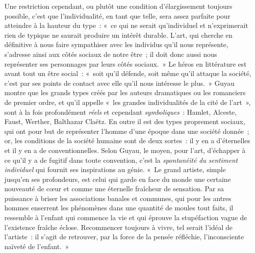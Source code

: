 \documentclass[french,twoside]{book} %
\begin{document}
Une restriction cependant, ou plutôt une condition d’élargissement toujours possible, c’est que l’individualité, en tant que telle, sera assez parfaite pour atteindre à la hauteur du type : « ce qui ne serait qu’individuel et n’exprimerait rien de typique ne saurait produire un intérêt durable. L’art, qui cherche en définitive à nous faire sympathiser avec les individus qu’il nous représente, s’adresse ainsi aux côtés sociaux de notre être ; il doit donc aussi nous représenter ses personnages par leurs côtés sociaux. » Le héros en littérature est avant tout un être social : « soit qu’il défende, soit même qu’il attaque la société, c’est par ses points de contact avec elle qu’il nous intéresse le plus. » Guyau montre que les grands types créés par les auteurs dramatiques ou les romanciers de premier ordre, et qu’il appelle « les grandes individualités de la cité de l’art », sont à la fois profondément \emph{réels} et cependant \emph{symboliques} : Hamlet, Alceste, Faust, Werther, Balthazar Claëtz. En outre il est des types proprement sociaux, qui ont pour but de représenter l’homme d’une époque dans une société donnée ; or, les conditions de la société humaine sont de deux sortes : il y en a d’éternelles et il y en a de conventionnelles. Selon Guyau, le moyen, pour l’art, d’échapper à ce qu’il y a de fugitif dans toute convention, c’est la \emph{spontanéité du sentiment individuel} qui fournit ses inspirations au génie. « Le grand artiste, simple jusqu’en ses profondeurs, est celui qui garde en face du monde une certaine nouveauté de cœur et comme une éternelle fraîcheur de sensation. Par sa puissance à briser les associations banales et communes, qui pour les antres hommes enserrent les phénomènes dans une quantité de moules tout faits, il ressemble à l’enfant qui commence la vie et qui éprouve la stupéfaction vague de l’existence fraîche éclose. Recommencer toujours à vivre, tel serait l’idéal de l’artiste : il s’agit de retrouver, par la force de la pensée réfléchie, l’inconsciente naïveté de l’enfant. »\par
\end{document}

